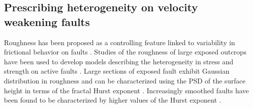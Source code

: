 \documentclass[preprint,1p, 10pt,authoryear]{elsarticle}
\begin{document}


\subsection{Prescribing heterogeneity on velocity weakening faults}
Roughness has been proposed as a controlling feature linked to variability in frictional behavior on faults \citep{Scholz1986,Scholz2002}. Studies of the roughness of large exposed outcrops have been used to develop models describing the heterogeneity in stress and strength on active faults \citep[e.g.,][]{Schmittbuhl2006}. Large sections of exposed fault exhibit Gaussian distribution in roughness \citep[e.g.,][]{Renard2006} and can be characterized using the PSD of the surface height in terms of the fractal Hurst exponent \citep{Power1991, Schmittbuhl1995, Candela2009}. Increasingly smoothed faults have been found to be characterized by higher values of the Hurst exponent \citep{Brodsky2011, Siman-Tov2013, Kirkpatrick2014, Candela2016, Brodsky2016}. 
\end{document}
